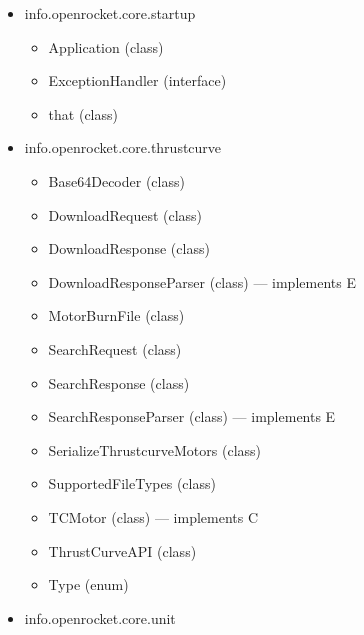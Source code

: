 \documentclass{amsdtx}
\begin{document}
\begin{itemize}
\begin{itemize}
    \begin{itemize}
    
    \item
      ApogeeEndListener (class) --- extends A
    \item
      GroundHitListener (class) --- extends A
    \item
      InterruptListener (class) --- extends A
    \item
      OptimumCoastListener (class) --- extends A
    \item
      RecoveryDeviceDeploymentEndListener (class) --- extends A
    \end{itemize}
  \item
    info.openrocket.core.startup

    \begin{itemize}
    
    \item
      Application (class)
    \item
      ExceptionHandler (interface)
    \item
      that (class)
    \end{itemize}
  \item
    info.openrocket.core.thrustcurve

    \begin{itemize}
    
    \item
      Base64Decoder (class)
    \item
      DownloadRequest (class)
    \item
      DownloadResponse (class)
    \item
      DownloadResponseParser (class) --- implements E
    \item
      MotorBurnFile (class)
    \item
      SearchRequest (class)
    \item
      SearchResponse (class)
    \item
      SearchResponseParser (class) --- implements E
    \item
      SerializeThrustcurveMotors (class)
    \item
      SupportedFileTypes (class)
    \item
      TCMotor (class) --- implements C
    \item
      ThrustCurveAPI (class)
    \item
      Type (enum)
    \end{itemize}
  \item
    info.openrocket.core.unit


\end{itemize}
\end{itemize}
\end{document}
